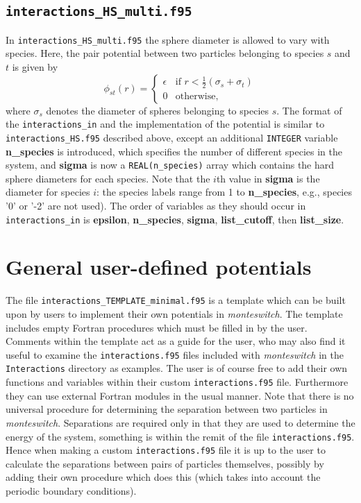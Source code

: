 \documentclass{report}
\begin{document}
\subsection{\texttt{interactions\_HS\_multi.f95}}
In \texttt{interactions\_HS\_multi.f95} the sphere diameter is allowed to vary with species. Here, the pair potential between two particles
belonging to species $s$ and $t$ is given by
\begin{equation}
\phi_{st}(r)=
\begin{cases} 
\epsilon & \text{if }r<\frac{1}{2}(\sigma_s+\sigma_t) \\
0 & \text{otherwise},
\end{cases}
\end{equation}
where $\sigma_s$ denotes the diameter of spheres belonging to species $s$. The format of the \texttt{interactions\_in}
and the implementation of the potential is similar to \texttt{interactions\_HS.f95} described above, except an additional
\texttt{INTEGER} variable \textbf{n\_species} is introduced, which specifies the number of different species in the system,
and \textbf{sigma} is now a \texttt{REAL(n\_species)} array which contains the hard sphere diameters for each species. Note
that the $i$th value in \textbf{sigma} is the diameter for species $i$: the species labels range from 1 to 
\textbf{n\_species}, e.g., species '0' or '-2' are not used).
The order of variables as they should occur in \texttt{interactions\_in} is \textbf{epsilon}, \textbf{n\_species}, \textbf{sigma}, 
\textbf{list\_cutoff}, then \textbf{list\_size}.


\section{General user-defined potentials}
The file \texttt{interactions\_TEMPLATE\_minimal.f95} is a template which can be built upon by users to implement their own potentials
in \emph{monteswitch}. The template includes empty Fortran procedures which must be filled in by the user. Comments within the template
act as a guide for the user, who may also find it useful to examine the \texttt{interactions.f95} files included with \emph{monteswitch} in the 
\texttt{Interactions} directory as examples. The user is of course free to add their own functions and variables within their custom
\texttt{interactions.f95} file. Furthermore they can use external Fortran modules in the usual manner. 
%
Note that there is no universal procedure for determining the separation between two particles in \emph{monteswitch}. Separations are
required only in that they are used to determine the energy of the system, something is within the remit of the file 
\texttt{interactions.f95}. Hence when making a custom \texttt{interactions.f95} file it is up to the user to calculate the separations
between pairs of particles themselves, possibly by adding their own procedure which does this (which takes into account the periodic
boundary conditions). 
\end{document}
